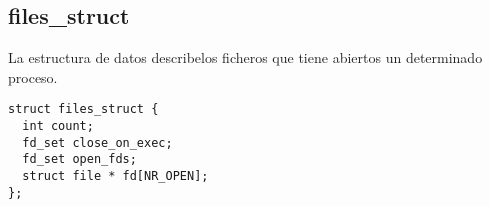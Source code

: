 \subsection*{files\_struct}

La estructura de datos  describelos ficheros que
tiene abiertos un determinado
proceso.
\begin{tscreen}\begin{verbatim}
struct files_struct {
  int count;
  fd_set close_on_exec;
  fd_set open_fds;
  struct file * fd[NR_OPEN];
};
\end{verbatim}\end{tscreen}

